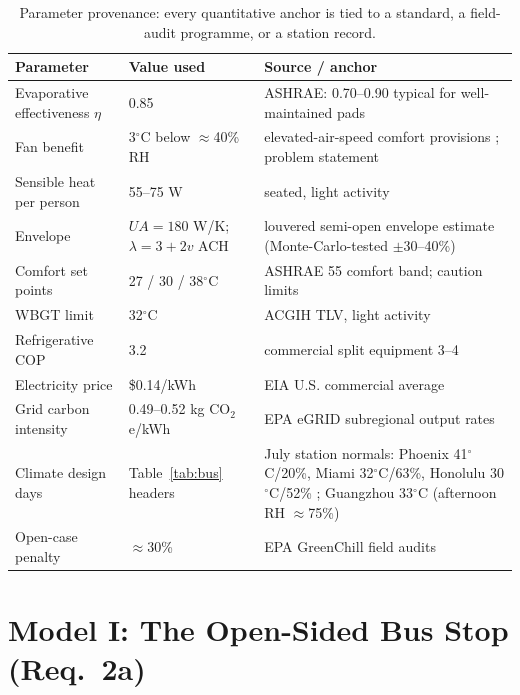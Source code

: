 \documentclass[11pt]{article}
\newcommand{\degrees}{\ensuremath{^\circ}}
\begin{document}
\begin{table}[H]\centering\footnotesize
\caption{Parameter provenance: every quantitative anchor is tied to a standard, a field-audit programme, or a station record.}\label{tab:prov}
\begin{tabular}{@{}p{4.0cm}p{2.8cm}p{6.6cm}@{}}
\toprule
Parameter & Value used & Source / anchor\\
\midrule
Evaporative effectiveness $\eta$ & 0.85 & ASHRAE: 0.70--0.90 typical for well-maintained pads \cite{ashrae}\\
Fan benefit & 3$\degrees$C below $\approx$40\% RH & elevated-air-speed comfort provisions \cite{ashrae55}; problem statement\\
Sensible heat per person & 55--75 W & seated, light activity \cite{ashrae}\\
Envelope & $UA=180$ W/K; $\lambda=3+2v$ ACH & louvered semi-open envelope estimate (Monte-Carlo-tested $\pm$30--40\%)\\
Comfort set points & 27 / 30 / 38$\degrees$C & ASHRAE 55 comfort band; caution limits \cite{ashrae55,acgih}\\
WBGT limit & 32$\degrees$C & ACGIH TLV, light activity \cite{acgih}\\
Refrigerative COP & 3.2 & commercial split equipment 3--4 \cite{doe}\\
Electricity price & \$0.14/kWh & EIA U.S. commercial average \cite{eia}\\
Grid carbon intensity & 0.49--0.52 kg CO$_2$e/kWh & EPA eGRID subregional output rates \cite{epagrid}\\
Climate design days & Table~\ref{tab:bus} headers & July station normals: Phoenix 41$\degrees$C/20\%, Miami 32$\degrees$C/63\%, Honolulu 30$\degrees$C/52\% \cite{noaa}; Guangzhou 33$\degrees$C (afternoon RH $\approx$75\%)\\
Open-case penalty & $\approx$30\% & EPA GreenChill field audits \cite{greenchill}\\
\bottomrule
\end{tabular}
\end{table}

\section{Model I: The Open-Sided Bus Stop (Req.\ 2a)}
\end{document}
